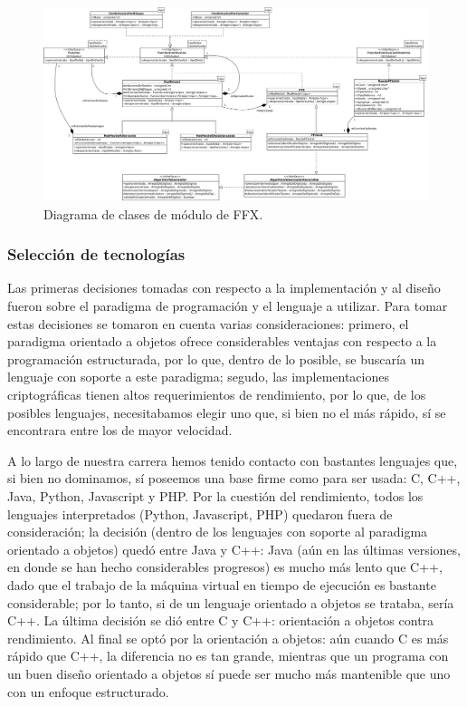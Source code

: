 \begin{figure}
  \begin{center}
    \includegraphics[width=1.0\linewidth]{diagramas/ffx.png}
    \caption{Diagrama de clases de módulo de FFX.}
    \label{clases_ffx}
  \end{center}
\end{figure}


\subsubsection{Selección de tecnologías}

Las primeras decisiones tomadas con respecto a la implementación y al diseño
fueron sobre el paradigma de programación y el lenguaje a utilizar. Para
tomar estas decisiones se tomaron en cuenta varias consideraciones: primero,
el paradigma orientado a objetos ofrece considerables ventajas con respecto
a la programación estructurada, por lo que, dentro de lo posible, se buscaría
un lenguaje con soporte a este paradigma; segudo, las implementaciones
criptográficas tienen altos requerimientos de rendimiento, por lo que, de los
posibles lenguajes, necesitabamos elegir uno que, si bien no el más rápido,
sí se encontrara entre los de mayor velocidad.

A lo largo de nuestra carrera hemos tenido contacto con bastantes lenguajes que,
si bien no dominamos, sí poseemos una base firme como para ser usada: C, C++,
Java, Python, Javascript y PHP. Por la cuestión del rendimiento, todos los
lenguajes interpretados (Python, Javascript, PHP) quedaron fuera de
consideración; la decisión (dentro de los lenguajes con soporte al paradigma
orientado a objetos) quedó entre Java y C++: Java (aún en las últimas versiones,
en donde se han hecho considerables progresos) es mucho más lento que C++,
dado que el trabajo de la máquina virtual en tiempo de ejecución es bastante
considerable; por lo tanto, si de un lenguaje orientado a objetos se trataba,
sería C++. La última decisión se dió entre C y C++: orientación a objetos contra
rendimiento. Al final se optó por la orientación a objetos: aún cuando C es
más rápido que C++, la diferencia no es tan grande, mientras que un programa
con un buen diseño orientado a objetos sí puede ser mucho más mantenible que
uno con un enfoque estructurado.

